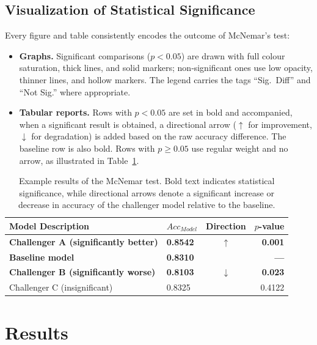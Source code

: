 \documentclass[a4paper,twoside,12pt]{book}
\newcommand{\mcnemarp}{p}
\begin{document}
\subsection{Visualization of Statistical Significance}

Every figure and table consistently encodes the outcome of McNemar’s test:

\begin{itemize}
	\item \textbf{Graphs.} Significant comparisons ($p < 0.05$) are drawn with full colour saturation, thick lines, and solid markers; non‑significant ones use low opacity, thinner lines, and hollow markers. The legend carries the tags “Sig.\ Diff” and “Not Sig.” where appropriate.
	\item \textbf{Tabular reports.} Rows with $p < 0.05$ are set in bold and accompanied, when a significant result is obtained, a directional arrow ($\uparrow$ for improvement, $\downarrow$ for degradation) is added based on the raw accuracy difference. The baseline row is also bold. Rows with $p \ge 0.05$ use regular weight and no arrow, as illustrated in Table~\ref{tab:McNemarExample}.
\end{itemize}

\begin{table}[htbp]
	\centering
	\caption{Example results of the McNemar test. Bold text indicates statistical significance, while directional arrows denote a significant increase or decrease in accuracy of the challenger model relative to the baseline.}
	\label{tab:McNemarExample}
	\begin{tabular}{llcr}
		\toprule
		Model Description & $Acc_{Model}$ & Direction & $\mcnemarp$-value \\
		\midrule
		\textbf{Challenger A (significantly better)} & \textbf{0.8542} & \textbf{$\uparrow$} & \textbf{0.001} \\
		\textbf{Baseline model}                      & \textbf{0.8310} &                      & \textbf{---}  \\
		\textbf{Challenger B (significantly worse)}  & \textbf{0.8103} & \textbf{$\downarrow$} & \textbf{0.023} \\
		Challenger C (insignificant)                 & 0.8325          &                      & 0.4122 \\
		\bottomrule
	\end{tabular}
\end{table}

\section{Results}
\label{sec:results}
\end{document}
